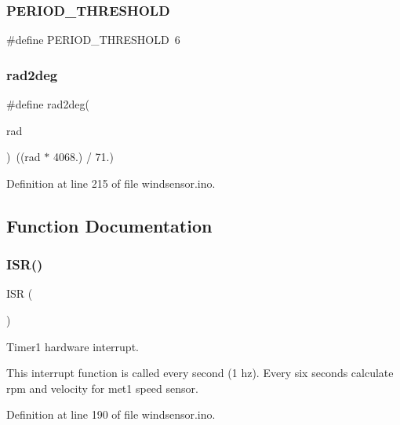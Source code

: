 \subsubsection{\texorpdfstring{P\+E\+R\+I\+O\+D\+\_\+\+T\+H\+R\+E\+S\+H\+O\+LD}{PERIOD\_THRESHOLD}}
{\footnotesize\ttfamily \#define P\+E\+R\+I\+O\+D\+\_\+\+T\+H\+R\+E\+S\+H\+O\+LD~6}

\mbox{\label{windsensor_8ino_aa0a2b2d4d920457dad62bbe8e268850e}} 
\subsubsection{\texorpdfstring{rad2deg}{rad2deg}}
{\footnotesize\ttfamily \#define rad2deg(\begin{DoxyParamCaption}\item[{}]{rad }\end{DoxyParamCaption})~((rad $\ast$ 4068.) / 71.)}



Definition at line 215 of file windsensor.\+ino.



\subsection{Function Documentation}
\mbox{\label{windsensor_8ino_ab16889ae984b9b798989a0d239283cac}} 
\subsubsection{\texorpdfstring{I\+S\+R()}{ISR()}}
{\footnotesize\ttfamily I\+SR (\begin{DoxyParamCaption}\item[{T\+I\+M\+E\+R1\+\_\+\+O\+V\+F\+\_\+vect}]{ }\end{DoxyParamCaption})}



Timer1 hardware interrupt. 

This interrupt function is called every second (1 hz). Every six seconds calculate rpm and velocity for met1 speed sensor. 

Definition at line 190 of file windsensor.\+ino.


